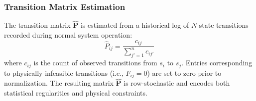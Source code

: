 \documentclass[manuscript,screen,review]{acmart}
\begin{document}
\subsubsection{Transition Matrix Estimation}
\label{sec:matrix_estimation}

The transition matrix $\hat{\mathbf{P}}$ is estimated from a
historical log of $N$ state transitions recorded during
normal system operation:
\begin{equation}
\hat{P}_{ij} = \frac{c_{ij}}{\sum_{j'=1}^{n} c_{ij'}}
\label{eq:matrix_est}
\end{equation}
where $c_{ij}$ is the count of observed transitions from
$s_i$ to $s_j$. Entries corresponding to physically
infeasible transitions (i.e., $F_{ij} = 0$) are set to zero
prior to normalization. The resulting matrix $\hat{\mathbf{P}}$
is row-stochastic and encodes both statistical regularities
and physical constraints.
\end{document}
